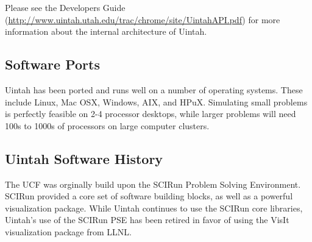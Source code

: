 Please see the Developers Guide
(\url{http://www.uintah.utah.edu/trac/chrome/site/UintahAPI.pdf}) for more
information about the internal architecture of Uintah.

\subsection{Software Ports}

Uintah has been ported and runs well on a number of operating
systems.  These include Linux, Mac OSX, Windows, AIX, and HPuX. Simulating
small problems is perfectly feasible on 2-4 processor desktops, while
larger problems will need 100s to 1000s of processors on large
computer clusters. 

\subsection{Uintah Software History}

The UCF was orginally build upon the SCIRun Problem Solving
Environment.  SCIRun provided a core set of software building blocks,
as well as a powerful visualization package.  While Uintah continues
to use the SCIRun core libraries, Uintah's use of the SCIRun PSE has
been retired in favor of using the VisIt visualization package from
LLNL.

